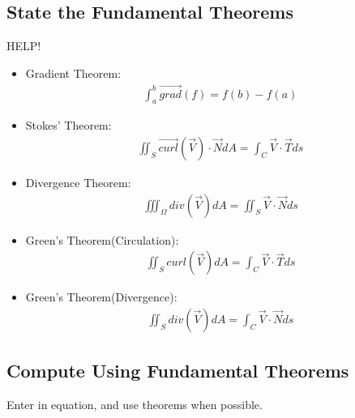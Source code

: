 \documentclass{article}
\begin{document}
\subsection{State the Fundamental Theorems}
HELP!
\begin{itemize}
\item Gradient Theorem:
\begin{gather*}
\int_{a}^{b} \overrightarrow{grad}(f) = f(b) - f(a)
\end{gather*}
\item Stokes' Theorem:
\begin{gather*}
\iint_S \overrightarrow{curl}(\vec{V})\cdot\vec{N}dA = \int_C \vec{V} \cdot \vec{T} ds
\end{gather*}
\item Divergence Theorem:
\begin{gather*}
\iiint_\Omega div(\vec{V})dA = \iint_S \vec{V} \cdot \vec{N} ds
\end{gather*}
\item Green's Theorem(Circulation):
\begin{gather*}
\iint_S curl(\vec{V})dA = \int_C \vec{V} \cdot \vec{T} ds
\end{gather*}
\item Green's Theorem(Divergence):
\begin{gather*}
\iint_S div(\vec{V})dA = \int_C \vec{V} \cdot \vec{N} ds
\end{gather*}
\end{itemize}
\subsection{Compute Using Fundamental Theorems}
Enter in equation, and use theorems when possible.
\end{document}

